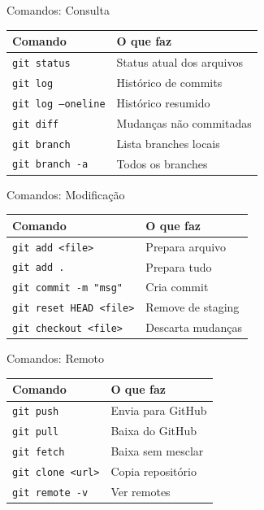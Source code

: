 \documentclass[11pt]{beamer}
\begin{document}
\begin{frame}{Comandos: Consulta}
\begin{tabular}{|l|l|}
\hline
\textbf{Comando} & \textbf{O que faz} \\
\hline
\texttt{git status} & Status atual dos arquivos \\
\texttt{git log} & Histórico de commits \\
\texttt{git log --oneline} & Histórico resumido \\
\texttt{git diff} & Mudanças não commitadas \\
\texttt{git branch} & Lista branches locais \\
\texttt{git branch -a} & Todos os branches \\
\hline
\end{tabular}
\end{frame}

\begin{frame}{Comandos: Modificação}
\begin{tabular}{|l|l|}
\hline
\textbf{Comando} & \textbf{O que faz} \\
\hline
\texttt{git add <file>} & Prepara arquivo \\
\texttt{git add .} & Prepara tudo \\
\texttt{git commit -m "msg"} & Cria commit \\
\texttt{git reset HEAD <file>} & Remove de staging \\
\texttt{git checkout <file>} & Descarta mudanças \\
\hline
\end{tabular}
\end{frame}

\begin{frame}{Comandos: Remoto}
\begin{tabular}{|l|l|}
\hline
\textbf{Comando} & \textbf{O que faz} \\
\hline
\texttt{git push} & Envia para GitHub \\
\texttt{git pull} & Baixa do GitHub \\
\texttt{git fetch} & Baixa sem mesclar \\
\texttt{git clone <url>} & Copia repositório \\
\texttt{git remote -v} & Ver remotes \\
\hline
\end{tabular}
\end{frame}

\end{document}
